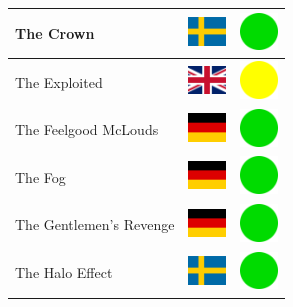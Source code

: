 \documentclass[12pt, a4paper, twoside]{report}
\begin{document}
\begin{center}
\begin{longtable}{|p{5cm}|p{2cm}|p{2cm}|}
 The Crown                                                  & \includegraphics[width=1cm]{../img/flags/se} &   \includegraphics[width=1cm]{../likes/y} \\ \hline
 The Exploited                                              & \includegraphics[width=1cm]{../img/flags/gb} &   \includegraphics[width=1cm]{../likes/m} \\ \hline
 The Feelgood McLouds                                       & \includegraphics[width=1cm]{../img/flags/de} &   \includegraphics[width=1cm]{../likes/y} \\ \hline
 The Fog                                                    & \includegraphics[width=1cm]{../img/flags/de} &   \includegraphics[width=1cm]{../likes/y} \\ \hline
 The Gentlemen's Revenge                                    & \includegraphics[width=1cm]{../img/flags/de} &   \includegraphics[width=1cm]{../likes/y} \\ \hline
 The Halo Effect                                            & \includegraphics[width=1cm]{../img/flags/se} &   \includegraphics[width=1cm]{../likes/y} \\ \hline

\end{longtable}
\end{center}
\end{document}
